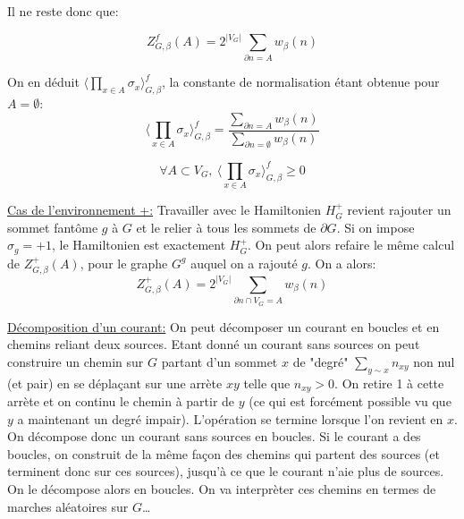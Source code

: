\documentclass[a4paper,12pt]{report}
\begin{document}
Il ne reste donc que:
\begin{prop}
$$
Z_{G,\beta}^f(A) = 2^{\vert V_G \vert} \sum_{\partial n  = A} w_{\beta}(n)
$$
\end{prop}

On en déduit $\langle \prod_{x \in A} \sigma_x \rangle_{G,\beta}^f$, la constante de normalisation étant obtenue pour $A = \emptyset$:
$$
\langle \prod_{x \in A} \sigma_x \rangle_{G,\beta}^f = \frac{\sum_{\partial n = A} w_{\beta}(n)}{\sum_{\partial n = \emptyset} w_{\beta}(n)}
$$

\begin{prop}
$$
\forall A \subset V_G, \ \langle \prod_{x \in A} \sigma_x \rangle_{G,\beta}^f \geq 0
$$
\end{prop}

\underline{Cas de l'environnement +:}
Travailler avec le Hamiltonien $H_{G}^+$ revient rajouter un sommet fantôme $g$ à $G$ et le relier à tous les sommets de $\partial G$. Si on impose $\sigma_g = +1$, le Hamiltonien est exactement $H_{G}^+$. On peut alors refaire le même calcul de $Z_{G,\beta}^+(A)$, pour le graphe $G^g$ auquel on a rajouté $g$. On a alors:
$$
Z_{G,\beta}^+(A) = 2^{\vert V_G \vert} \sum_{\partial n \cap V_G  = A} w_{\beta}(n)
$$

\underline{Décomposition d'un courant:} On peut décomposer un courant en boucles et en chemins reliant deux sources. Etant donné un courant sans sources on peut construire un chemin sur $G$ partant d'un sommet $x$ de "degré" $\sum_{y \sim x} n_{xy}$ non nul (et pair) en se déplaçant sur une arrète $xy$ telle que $n_{xy}>0$. On retire 1 à cette arrète et on continu le chemin à partir de $y$ (ce qui est forcément possible vu que $y$ a maintenant un degré impair). L'opération se termine lorsque l'on revient en $x$. On décompose donc un courant sans sources en boucles. Si le courant a des boucles, on construit de la même façon des chemins qui partent des sources (et terminent donc sur ces sources), jusqu'à ce que le courant n'aie plus de sources. On le décompose alors en boucles. On va interprèter ces chemins en termes de marches aléatoires sur $G$\dots
\end{document}
